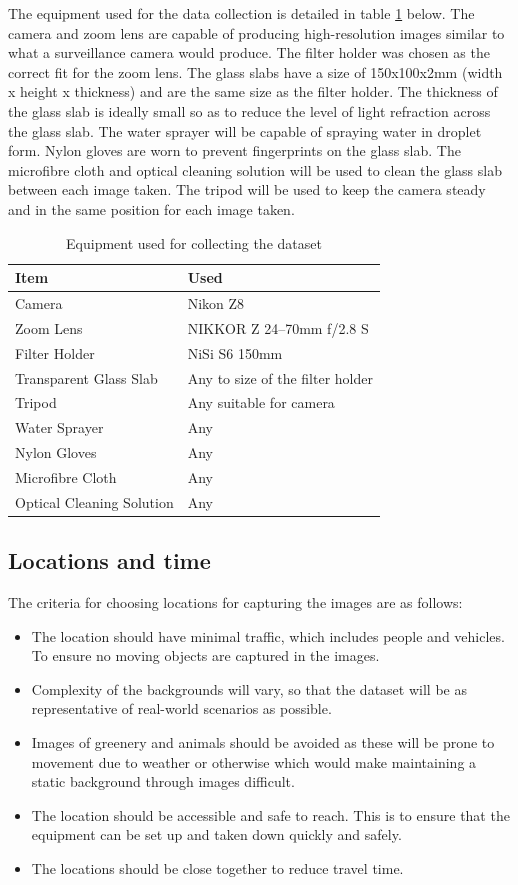 \documentclass[11pt]{ociamthesis}  %
\begin{document}
The equipment used for the data collection is detailed in table \ref{tab:equipment} below. The camera and zoom lens are capable of producing high-resolution images similar to what a surveillance camera would produce. The filter holder was chosen as the correct fit for the zoom lens. The glass slabs have a size of 150x100x2mm (width x height x thickness) and are the same size as the filter holder. The thickness of the glass slab is ideally small so as to reduce the level of light refraction across the glass slab. The water sprayer will be capable of spraying water in droplet form. Nylon gloves are worn to prevent fingerprints on the glass slab. The microfibre cloth and optical cleaning solution will be used to clean the glass slab between each image taken. The tripod will be used to keep the camera steady and in the same position 
for each image taken.

\begin{table}[h]
\centering
\caption{Equipment used for collecting the dataset}
\label{tab:equipment}
\begin{tabular}{ll}
Item & Used \\
\hline
Camera & Nikon Z8 \\
Zoom Lens & NIKKOR Z 24--70mm f/2.8 S \\
Filter Holder & NiSi S6 150mm \\
Transparent Glass Slab & Any to size of the filter holder \\
Tripod & Any suitable for camera \\
Water Sprayer & Any \\
Nylon Gloves & Any \\
Microfibre Cloth & Any \\
Optical Cleaning Solution & Any \\
\end{tabular}
\end{table}


\subsection{Locations and time}
The criteria for choosing locations for capturing the images are as follows:

\begin{itemize}
    \item The location should have minimal traffic, which includes people and vehicles. To ensure no moving objects are captured in the images.
    \item Complexity of the backgrounds will vary, so that the dataset will be as representative of real-world scenarios as possible.
    \item Images of greenery and animals should be avoided as these will be prone to movement due to weather or otherwise which would make maintaining a static background through images difficult.
    \item The location should be accessible and safe to reach. This is to ensure that the equipment can be set up and taken down quickly and safely.
    \item The locations should be close together to reduce travel time.
\end{itemize}
\end{document}
